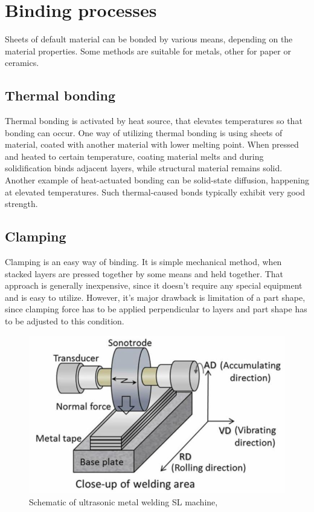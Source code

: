 \documentclass[a4paper, twoside, 11pt]{report}
\begin{document}
\section{Binding processes}
Sheets of default material can be bonded by various means, depending on the material properties. Some methods are suitable for metals, other for paper or ceramics.

\subsection{Thermal bonding}
Thermal bonding is activated by heat source, that elevates temperatures so that bonding can occur. One way of utilizing thermal bonding is using sheets of material, coated with another material with lower melting point. When pressed and heated to certain temperature, coating material melts and during solidification binds adjacent layers, while structural material remains solid. Another example of heat-actuated bonding can be solid-state diffusion, happening at elevated temperatures. Such thermal-caused bonds typically exhibit very good strength.

\subsection{Clamping}
Clamping is an easy way of binding. It is simple mechanical method, when stacked layers are pressed together by some means and held together. That approach is generally inexpensive, since it doesn't require any special equipment and is easy to utilize. However, it's major drawback is limitation of a part shape, since clamping force has to be applied perpendicular to layers and part shape has to be adjusted to this condition.

\begin{figure}[h!]
	\centering
	\includegraphics[scale=0.8]{sonotrode}
	\caption{Schematic of ultrasonic metal welding SL machine, \cite{sonotrode}}
\end{figure}
\end{document}
